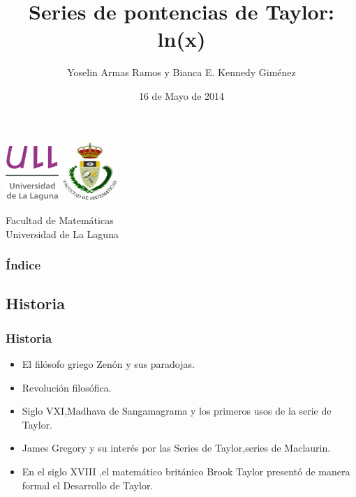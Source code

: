 \documentclass{beamer}
\title[Presentacion con Beamer]{Series de pontencias de Taylor: ln(x)} %
\author[Técnicas experimentales{ULL}]{Yoselin Armas Ramos y Bianca E. Kennedy Giménez}
\date[16-05-14]{16 de Mayo de 2014}
\begin{document}
\begin{frame}

  \includegraphics[width=0.15\textwidth]{img/logotipo-secundario-ULL}
  \hspace*{7.0cm}
  \includegraphics[width=0.16\textwidth]{img/fmatesc}
  \titlepage
  
  \begin{small}
    \begin{center}
     Facultad de Matemáticas \\
     Universidad de La Laguna
    \end{center}
  \end{small}
\end{frame}


\begin{frame}
\frametitle{Índice}
\tableofcontents[pausesections] %
\end{frame}

\begin{frame}
\section{Historia} %
\frametitle{Historia}
\begin{itemize}
\item El filósofo griego Zenón y sus paradojas.
\item Revolución filosófica.
\item Siglo VXI,Madhava de Sangamagrama y los primeros usos de la serie de Taylor.
\item James Gregory y su interés por las Series de Taylor,series de Maclaurin.
\item En el siglo XVIII ,el matemático británico Brook Taylor presentó de manera formal el Desarrollo de Taylor.
\end{itemize}
\end{frame}
\end{document}
